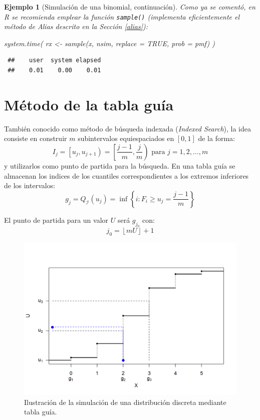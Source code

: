 \documentclass[
]{book}
\newenvironment{Shaded}{\begin{snugshade}}{\end{snugshade}}
\newcommand{\AttributeTok}[1]{\textcolor[rgb]{0.77,0.63,0.00}{#1}}
\newcommand{\ConstantTok}[1]{\textcolor[rgb]{0.00,0.00,0.00}{#1}}
\newcommand{\FunctionTok}[1]{\textcolor[rgb]{0.00,0.00,0.00}{#1}}
\newcommand{\NormalTok}[1]{#1}
\newcommand{\OtherTok}[1]{\textcolor[rgb]{0.56,0.35,0.01}{#1}}
\theoremstyle{break}
\newtheorem{example}{Ejemplo}[chapter]
\theoremstyle{nonumberplain}
\begin{document}
\begin{example}[Simulación de una binomial, continuación]
Como ya se comentó, en R se recomienda emplear la función \texttt{sample()}
(implementa eficientemente el método de Alias descrito en la Sección \ref{alias}):

\begin{Shaded}
\begin{Highlighting}[]
\FunctionTok{system.time}\NormalTok{( rx }\OtherTok{\textless{}{-}} \FunctionTok{sample}\NormalTok{(x, nsim, }\AttributeTok{replace =} \ConstantTok{TRUE}\NormalTok{, }\AttributeTok{prob =}\NormalTok{ pmf) )}
\end{Highlighting}
\end{Shaded}

\begin{verbatim}
 ##    user  system elapsed 
 ##    0.01    0.00    0.01
\end{verbatim}

\end{example}

\hypertarget{muxe9todo-de-la-tabla-guuxeda}{%
\section{Método de la tabla guía}\label{muxe9todo-de-la-tabla-guuxeda}}

También conocido como método de búsqueda indexada (\emph{Indexed Search}), la idea consiste en construir \(m\) subintervalos equiespaciados en \([0,1]\) de la forma:
\[I_{j}=\left[ u_{j},u_{j+1}\right) =\left[ \frac{j-1}{m},\frac{j}{m}\right) 
\text{ para }j=1,2,\ldots ,m\]
y utilizarlos como punto de partida para la búsqueda.
En una tabla guía se almacenan los indices de los cuantiles correspondientes a los extremos inferiores de los intervalos:
\[g_{j}=Q_{\mathcal{I}}(u_{j})=\inf \left\{ i:F_{i}\geq u_{j}=\frac{j-1}{m}\right\}\]

El punto de partida para un valor \(U\) será \(g_{j_{0}}\) con:
\[j_{0}=\left\lfloor mU\right\rfloor +1\]

\begin{figure}[!htb]

{\centering \includegraphics[width=0.8\linewidth]{images/tabla-sim} 

}

\caption{Ilustración de la simulación de una distribución discreta mediante tabla guía.}\label{fig:tabla-movie}
\end{figure}
\end{document}
